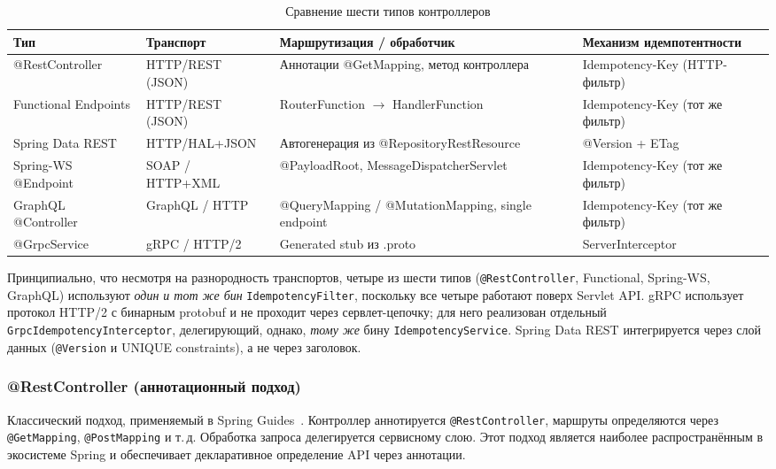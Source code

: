 \begin{table}[H]
\centering
\caption{Сравнение шести типов контроллеров}
\label{tab:controller-types}
\scriptsize
\begin{tabularx}{\textwidth}{@{}l l X X@{}}
\toprule
\textbf{Тип} & \textbf{Транспорт} & \textbf{Маршрутизация / обработчик} & \textbf{Механизм идемпотентности} \\
\midrule
@RestController              & HTTP/REST (JSON) & Аннотации @GetMapping, метод контроллера                & Idempotency-Key (HTTP-фильтр) \\
Functional Endpoints         & HTTP/REST (JSON) & RouterFunction $\to$ HandlerFunction                    & Idempotency-Key (тот же фильтр) \\
Spring Data REST             & HTTP/HAL+JSON    & Автогенерация из @RepositoryRestResource                & @Version + ETag \\
Spring-WS @Endpoint          & SOAP / HTTP+XML  & @PayloadRoot, MessageDispatcherServlet                  & Idempotency-Key (тот же фильтр) \\
GraphQL @Controller          & GraphQL / HTTP   & @QueryMapping / @MutationMapping, single endpoint       & Idempotency-Key (тот же фильтр) \\
@GrpcService                 & gRPC / HTTP/2    & Generated stub из .proto                                & ServerInterceptor \\
\bottomrule
\end{tabularx}
\end{table}

Принципиально, что несмотря на разнородность транспортов, четыре из шести типов (\texttt{@RestController}, Functional, Spring-WS, GraphQL) используют \emph{один и тот же бин} \texttt{IdempotencyFilter}, поскольку все четыре работают поверх Servlet API. gRPC использует протокол HTTP/2 с бинарным protobuf и не проходит через сервлет-цепочку; для него реализован отдельный \texttt{GrpcIdempotencyInterceptor}, делегирующий, однако, \emph{тому же} бину \texttt{IdempotencyService}. Spring Data REST интегрируется через слой данных (\texttt{@Version} и UNIQUE constraints), а не через заголовок.

\subsubsection{@RestController (аннотационный подход)}

Классический подход, применяемый в Spring Guides~\cite{spring-guides-rest}. Контроллер аннотируется \texttt{@RestController}, маршруты определяются через \texttt{@GetMapping}, \texttt{@PostMapping} и т.\,д. Обработка запроса делегируется сервисному слою. Этот подход является наиболее распространённым в экосистеме Spring и обеспечивает декларативное определение API через аннотации.

